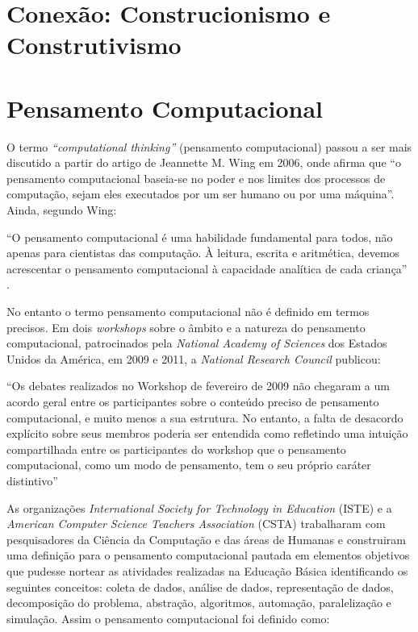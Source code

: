 \documentclass[12pt, openright, a4paper, brazil, english, french, spanish, bibjustif, openany, oneside]{abntex2}
\begin{document}
\newpage

\section{Conexão: Construcionismo e Construtivismo}

\section{Pensamento Computacional}

O termo \textit{``computational thinking''} (pensamento computacional) passou a ser mais discutido a partir do artigo de Jeannette M. Wing em 2006, onde afirma que ``o pensamento computacional baseia-se no poder e nos limites dos processos de computação, sejam eles executados por um ser humano ou por uma máquina''\cite{wing}. Ainda, segundo Wing:

\begin{citacao}

``O pensamento computacional é uma habilidade fundamental para todos, não apenas para cientistas das computação. À leitura, escrita e aritmética, devemos acrescentar o pensamento computacional à capacidade analítica de cada criança'' \cite{wing}.

\end{citacao}




No entanto o termo pensamento computacional não é definido em termos precisos. Em dois \textit{workshops} sobre o âmbito e a natureza do pensamento computacional, patrocinados pela \textit{National Academy of Sciences} dos Estados Unidos da América, em 2009 e 2011, a \textit{National Research Council} publicou:

\begin{citacao}

``Os debates realizados no Workshop de fevereiro de 2009 não chegaram a um acordo geral entre os participantes sobre o conteúdo preciso de pensamento computacional, e muito menos a sua estrutura. No entanto, a falta de desacordo explícito sobre seus membros poderia ser entendida como refletindo uma intuição compartilhada entre os participantes do workshop que o pensamento computacional, como um modo de pensamento, tem o seu próprio caráter distintivo'' \cite{NRC}

\end{citacao}

As organizações \textit{International Society for Technology in Education} (ISTE) e a \textit{American Computer Science Teachers Association} (CSTA) trabalharam com pesquisadores da Ciência da Computação e das áreas de Humanas e construiram uma definição para o pensamento computacional pautada em elementos objetivos que pudesse nortear as atividades realizadas na Educação Básica identificando os seguintes conceitos: coleta de dados, análise de dados, representação de dados, decomposição do problema, abstração, algoritmos, automação, paralelização e simulação. Assim o pensamento computacional foi definido como:
\end{document}
